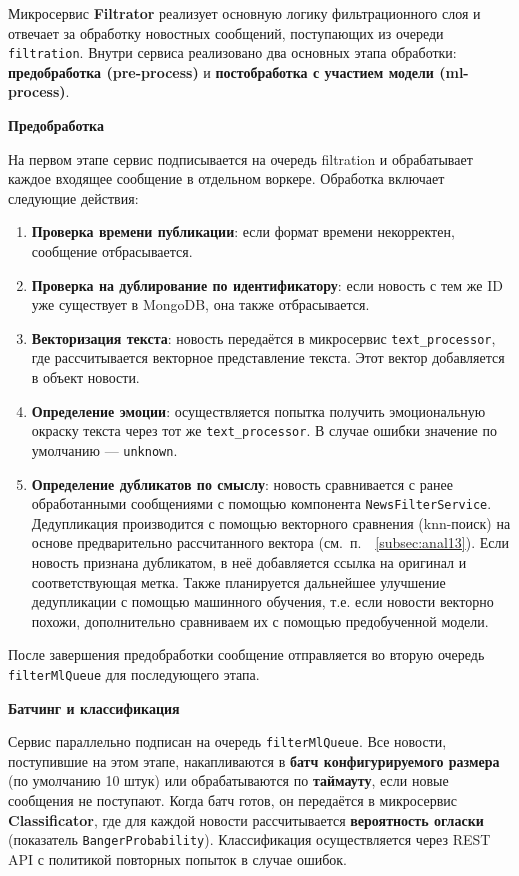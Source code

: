 Микросервис \textbf{Filtrator} реализует основную логику фильтрационного слоя и отвечает за обработку новостных сообщений, поступающих из очереди \texttt{filtration}.
Внутри сервиса реализовано два основных этапа обработки: \textbf{предобработка (pre-process)} и \textbf{постобработка с участием модели (ml-process)}.

\textbf{Предобработка}

На первом этапе сервис подписывается на очередь filtration и обрабатывает каждое входящее сообщение в отдельном воркере. Обработка включает следующие действия:
\begin{enumerate}
    \item \textbf{Проверка времени публикации}: если формат времени некорректен, сообщение отбрасывается.
    \item \textbf{Проверка на дублирование по идентификатору}: если новость с тем же ID уже существует в MongoDB, она также отбрасывается.
    \item \textbf{Векторизация текста}: новость передаётся в микросервис \texttt{text\_processor}, где рассчитывается векторное представление текста. Этот вектор добавляется в объект новости.
    \item \textbf{Определение эмоции}: осуществляется попытка получить эмоциональную окраску текста через тот же \texttt{text\_processor}. В случае ошибки значение по умолчанию — \texttt{unknown}.
    \item \textbf{Определение дубликатов по смыслу}: новость сравнивается с ранее обработанными сообщениями с помощью компонента \texttt{NewsFilterService}.
    Дедупликация производится с помощью векторного сравнения (knn-поиск) на основе предварительно рассчитанного вектора (см.\ п.\ ~\ref{subsec:anal13}).
    Если новость признана дубликатом, в неё добавляется ссылка на оригинал и соответствующая метка.
    Также планируется дальнейшее улучшение дедупликации с помощью машинного обучения, т.е. если новости векторно похожи, дополнительно сравниваем их с помощью предобученной модели.
\end{enumerate}

После завершения предобработки сообщение отправляется во вторую очередь \texttt{filterMlQueue} для последующего этапа.

\textbf{Батчинг и классификация}

Сервис параллельно подписан на очередь \texttt{filterMlQueue}.
Все новости, поступившие на этом этапе, накапливаются в \textbf{батч конфигурируемого размера} (по умолчанию 10 штук) или обрабатываются по \textbf{таймауту}, если новые сообщения не поступают.
Когда батч готов, он передаётся в микросервис \textbf{Classificator}, где для каждой новости рассчитывается \textbf{вероятность огласки} (показатель \texttt{BangerProbability}).
Классификация осуществляется через REST API с политикой повторных попыток в случае ошибок.

